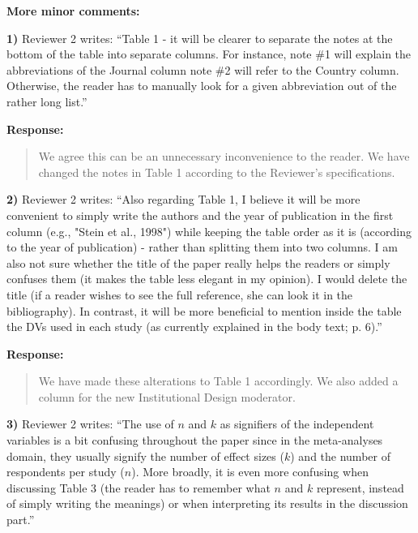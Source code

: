\documentclass[a4paper,12pt]{article}
\begin{document}
\vspace{.3cm}

\noindent \textbf{More minor comments:}

\vspace{.3cm}

\noindent \textbf{1)} Reviewer 2 writes: ``Table 1 - it will be clearer to separate the notes at the bottom of the table into separate columns. For instance, note \#1 will explain the abbreviations of the Journal column note \#2 will refer to the Country column. Otherwise, the reader has to manually look for a given abbreviation out of the rather long list.''

\vspace{.3cm}

\noindent \textbf{Response:} 
\begin{quote}
    We agree this can be an unnecessary inconvenience to the reader. We have changed the notes in Table 1 according to the Reviewer's specifications. 
\end{quote}

\vspace{.3cm}

\noindent \textbf{2)} Reviewer 2 writes: ``Also regarding Table 1, I believe it will be more convenient to simply write the authors and the year of publication in the first column (e.g., "Stein et al., 1998") while keeping the table order as it is (according to the year of publication) - rather than splitting them into two columns. I am also not sure whether the title of the paper really helps the readers or simply confuses them (it makes the table less elegant in my opinion). I would delete the title (if a reader wishes to see the full reference, she can look it in the bibliography). In contrast, it will be more beneficial to mention inside the table the DVs used in each study (as currently explained in the body text; p. 6).''

\vspace{.3cm}

\noindent \textbf{Response:} 
\begin{quote}
    We have made these alterations to Table 1 accordingly. We also added a column for the new Institutional Design moderator.
\end{quote}

\vspace{.3cm}

\noindent \textbf{3)} Reviewer 2 writes: ``The use of $n$ and $k$ as signifiers of the independent variables is a bit confusing throughout the paper since in the meta-analyses domain, they usually signify the number of effect sizes ($k$) and the number of respondents per study ($n$). More broadly, it is even more confusing when discussing Table 3 (the reader has to remember what $n$ and $k$ represent, instead of simply writing the meanings) or when interpreting its results in the discussion part.''
\end{document}

